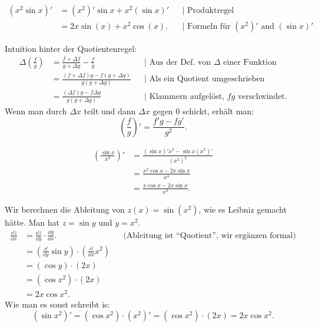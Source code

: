 \begin{bsp}[zu Produktregel] 
	\begin{align*}
		(x^2 \sin x)' & = (x^2)' \sin x + x^2 (\sin x)'  & & |\text{ Produktregel}
		\\ & = 2 x \sin(x)+ x^2 \cos(x). & & |\text{ Formeln für $(x^2)'$ and $(\sin x)'$} 
	\end{align*}
\end{bsp} 

\begin{bem} 
	Intuition hinter der Quotientenregel: 
	\begin{align*}
	\Delta \left( \frac{f}{g} \right) & = \frac{ f + \Delta f}{g + \Delta g} - \frac{f}{g}  & & |\text{ Aus der Def. von $\Delta$ einer Funktion} 
	\\ & = \frac{(f+ \Delta f) g - f (g + \Delta g) }{ g (g + \Delta g)} 
	& & |\text{ Als ein Quotient umgeschrieben}
	\\ & =  \frac{(\Delta f) g - f \Delta g }{g (g + \Delta g)} & & 
	|\text{ Klammern aufgelöst, $fg$ verschwindet.}
	\end{align*}
	Wenn man durch $\Delta x$ teilt und dann $\Delta x$ gegen $0$ schickt, erhält man: 
	\[
	\left( \frac{f}{g} \right)' = \frac{f' g - f g'}{g^2}. 
	\]
\end{bem} 


\begin{bsp}[zu Quotientenregel]
	\begin{align*}
		\left( \frac{\sin x}{x^2} \right)' & = \frac{ (\sin x)'   x^2 - \sin x (x^2)'}{(x^2)^2} 
		\\ & = \frac{x^2 \cos x - 2 x \sin x}{x^4}
		\\ & = \frac{ x \cos x - 2 x \sin x}{x^3}. 
	\end{align*}
\end{bsp} 

\begin{bsp}
	Wir berechnen die Ableitung von $z(x) = \sin (x^2)$, wie es Leibniz gemacht hätte. Man hat $z = \sin y$ und $y = x^2$. 
	\begin{align*}
		\frac{\dd z}{\dd x} & = \frac{\dd z}{\dd y} \cdot \frac{\dd y}{\dd x}. &  & \text{(Ableitung ist ``Quotient'', wir ergänzen formal)}
		\\ & = (\frac{\dd}{\dd y} \sin y) \cdot (\frac{\dd}{\dd x} x^2)
		\\ & = (\cos y) \cdot (2 x)
		\\ & = (\cos x^2) \cdot (2 x)
		\\ & = 2 x \cos x^2.
	\end{align*}
	Wie man es sonst schreibt is:
	\[
		(\sin x^2)' = (\cos x^2) \cdot (x^2)' = (\cos x^2) \cdot (2 x) = 2 x \cos x^2. 
	\]
\end{bsp} 

